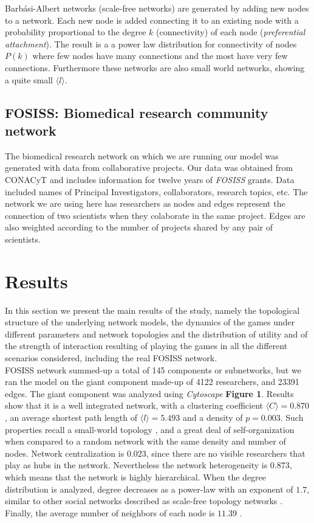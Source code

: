 \documentclass[11pt]{article}
\begin{document}
Barb\'asi-Albert networks \cite{Barabasi1999} (scale-free networks) are generated by adding new nodes to a network. Each new node is added connecting it to an existing node with a probability proportional to the degree $k$ (connectivity) of each node (\textit{preferential attachment}). The result is a a power law distribution for connectivity of nodes $P(k)$ where few nodes have many connections and the most have very few connections. Furthermore these networks are also small world networks, showing a quite small $\langle l \rangle$.


\subsection{FOSISS: Biomedical research community network}

The biomedical research network on which we are running our model was generated 
with data from collaborative projects. Our data was obtained from CONACyT and includes information for twelve years of \textit{FOSISS} grants. Data included names of Principal Investigators, collaborators, research topics, etc. The network we are using here has researchers as nodes and edges represent the connection of two scientists when they colaborate in the same project. Edges are also weighted according to the number of projects shared by any pair of scientists.\\


\section{Results}
\label{sec:3}

In this section we present the main results of the study, namely the topological
structure of the underlying network models, the dynamics of the games under
different parameters and network topologies and the distribution of utility and
of the strength of interaction resulting of playing the games in all the
different scenarios considered, including the real FOSISS network.\\


FOSISS network summed-up a total of 145 components or subnetworks, but we ran
the model on the giant component made-up of 4122 researchers, and 23391 edges.
The giant component was analyzed using \textit{Cytoscape} \textbf{Figure
  1}. Results show that it is a well integrated network, with a clustering
coefficient $\langle C \rangle = 0.870$, an average shortest path length of
$\langle l \rangle = 5.493$  and a density of $p = 0.003$. Such properties
recall a small-world topology \cite{Watts1998}, and a great deal of
self-organization when compared to a random network with the same density and
number of nodes. Network centralization is $0.023$, since there are no visible
researchers that play as hubs in the network. Nevertheless the network
heterogeneity is $0.873$, which means that the network is highly
hierarchical. When the degree distribution is analyzed, degree decreases as a
power-law with an exponent of $1.7$, similar to other social networks described
as scale-free topology networks \cite{Barabasi1999}. Finally, the average number
of neighbors of each node is $11.39$ \cite{Shannon2003}.\\
\end{document}
